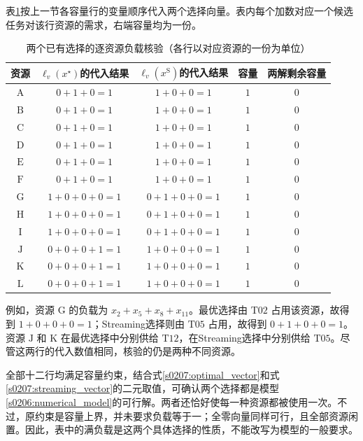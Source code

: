 表\ref{s0207:load_check}按上一节各容量行的变量顺序代入两个选择向量。表内每个加数对应一个候选任务对该行资源的需求，右端容量均为一份。

\begin{table}[htbp]
 \centering
 \caption{两个已有选择的逐资源负载核验（各行以对应资源的一份为单位）}
 \label{s0207:load_check}
 \small
 \begin{tabular}{ccccc}
  \toprule
  资源 & $\ell_v(x^{\star})$的代入结果 & $\ell_v(x^{\mathrm{S}})$的代入结果 & 容量 & 两解剩余容量 \\
  \midrule
  $\mathrm{A}$ & $0+1+0=1$ & $1+0+0=1$ & $1$ & $0$ \\
  $\mathrm{B}$ & $0+1+0=1$ & $1+0+0=1$ & $1$ & $0$ \\
  $\mathrm{C}$ & $0+1+0=1$ & $1+0+0=1$ & $1$ & $0$ \\
  $\mathrm{D}$ & $0+1+0=1$ & $1+0+0=1$ & $1$ & $0$ \\
  $\mathrm{E}$ & $0+1+0=1$ & $1+0+0=1$ & $1$ & $0$ \\
  $\mathrm{F}$ & $0+1+0=1$ & $1+0+0=1$ & $1$ & $0$ \\
  $\mathrm{G}$ & $1+0+0+0=1$ & $0+1+0+0=1$ & $1$ & $0$ \\
  $\mathrm{H}$ & $1+0+0+0=1$ & $0+1+0+0=1$ & $1$ & $0$ \\
  $\mathrm{I}$ & $1+0+0+0=1$ & $0+1+0+0=1$ & $1$ & $0$ \\
  $\mathrm{J}$ & $0+0+0+1=1$ & $1+0+0+0=1$ & $1$ & $0$ \\
  $\mathrm{K}$ & $0+0+0+1=1$ & $1+0+0+0=1$ & $1$ & $0$ \\
  $\mathrm{L}$ & $0+0+0+1=1$ & $1+0+0+0=1$ & $1$ & $0$ \\
  \bottomrule
 \end{tabular}
\end{table}

例如，资源 $\mathrm{G}$ 的负载为 $x_2+x_5+x_8+x_{11}$。最优选择由 $\mathrm{T02}$ 占用该资源，故得到 $1+0+0+0=1$；Streaming选择则由 $\mathrm{T05}$ 占用，故得到 $0+1+0+0=1$。资源 $\mathrm{J}$ 和 $\mathrm{K}$ 在最优选择中分别供给 $\mathrm{T12}$，在Streaming选择中分别供给 $\mathrm{T05}$。尽管这两行的代入数值相同，核验的仍是两种不同资源。

全部十二行均满足容量约束，结合式\eqref{s0207:optimal_vector}和式\eqref{s0207:streaming_vector}的二元取值，可确认两个选择都是模型\eqref{s0206:numerical_model}的可行解。两者还恰好使每一种资源都被使用一次。不过，原约束是容量上界，并未要求负载等于一；全零向量同样可行，且全部资源闲置。因此，表中的满负载是这两个具体选择的性质，不能改写为模型的一般要求。

